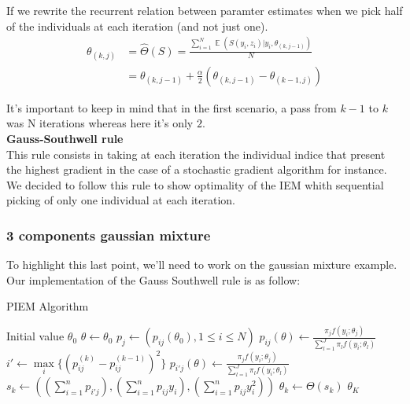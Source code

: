 \documentclass[a4paper]{article}
\theoremstyle{plain}
\DeclareMathOperator*{\E}{\mathbb{E}}
\theoremstyle{plain}
\theoremstyle{definition}
\begin{document}
If we rewrite the recurrent relation between paramter estimates when we pick half of the individuals at each iteration (and not just one).
\begin{equation}
\begin{split}
\theta_{(k,j)} &  = \hat{\Theta}(S) = \frac{\sum_{i=1}^{N}{\E{(S(y_i,z_i)|y_i,\theta_{(k,j-1)})}}}{N}\\
& =  \theta_{(k,j-1)} + \frac{\alpha}{2}(\theta_{(k,j-1)} - \theta_{(k-1,j)})
\end{split}
\end{equation}

It's important to keep in mind that in the first scenario, a pass from $k-1$ to $k$ was N iterations whereas here it's only $2$.\\
\textbf{Gauss-Southwell rule}\\
This rule consists in taking at each iteration the individual indice that present the highest gradient in the case of a stochastic gradient algorithm for instance.\\
We decided to follow this rule to show optimality of the IEM whith sequential picking of only one individual at each iteration. 
\subsubsection{3 components gaussian mixture}
To highlight this last point, we'll need to work on the gaussian mixture example.\\
Our implementation of the Gauss Southwell rule is as follow:


\begin{algorithm}
    \caption{PIEM Algorithm}
    \label{alg:pseudoPIEM}
    \begin{algorithmic}[1]
    \State Initial value $\theta_0$
    \State $\theta \gets \theta_0$
    \State $p_{j} \gets (p_{ij}(\theta_0),1\leqslant i \leqslant N)$
        \State $p_{ij}(\theta) \gets \frac{\pi_jf(y_i;\theta_j)}{\sum_{l=1}^{J}\pi_lf(y_i;\theta_l)}$
        \EndFor  
        \State $i' \gets \max\limits_{i}\{(p^{(k)}_{ij}-p^{(k-1)}_{ij})^2\}$
        \State $p_{i'j}(\theta) \gets \frac{\pi_jf(y_i;\theta_j)}{\sum_{l=1}^{J}\pi_lf(y_i;\theta_l)}$
        \State $s_k \gets ((\sum_{i=1}^{n}{p_{i'j}}),(\sum_{i=1}^{n}{p_{ij}y_i}),(\sum_{i=1}^{n}{p_{ij}y_i^2}))$
        \State $\theta_k \gets \Theta(s_k)$
    \EndFor  
    \State \Return $\theta_K$
    \end{algorithmic}
\end{algorithm}
\end{document}
